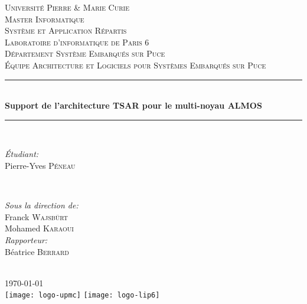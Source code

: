\begin{titlepage}

\newcommand{\HRule}{\rule{\linewidth}{0.44mm}}
\center


\textsc{\LARGE Université Pierre \& Marie Curie}\\[0.44cm]
\textsc{\Large Master Informatique}\\[0.44cm]
\textsc{\large Système et Application Répartis}\\[1.44cm]

\textsc{\LARGE Laboratoire d'informatique de Paris 6}\\[0.44cm]
\textsc{\Large Département Système Embarqués sur Puce}\\[0.44cm]
\textsc{\large Équipe Architecture et Logiciels pour Systèmes Embarqués sur
  Puce}\\[1.44cm]

\HRule \\[0.4cm] { \huge
  \bfseries Support de l'architecture TSAR pour le multi-noyau ALMOS}\\[0.4cm]
\HRule \\[1.44cm]


\begin{minipage}{0.4\textwidth}
\begin{flushleft} \large
\emph{Étudiant:}\\ Pierre-Yves \textsc{Péneau}
\end{flushleft}
\end{minipage}
~
\begin{minipage}{0.4\textwidth}
\begin{flushright} \large
  \emph{Sous la direction de:} \\ Franck \textsc{Wajsbürt}\\ Mohamed
  \textsc{Karaoui}\\\vspace{1.44cm} \emph{Rapporteur:} \\ Béatrice
  \textsc{Berrard}
\end{flushright}
\end{minipage}\\[2cm]


{\large \today}\\[3cm]


\texttt{[image: logo-upmc]}\hspace{3cm}
\texttt{[image: logo-lip6]}\\[1cm]
\vfill

\end{titlepage}
